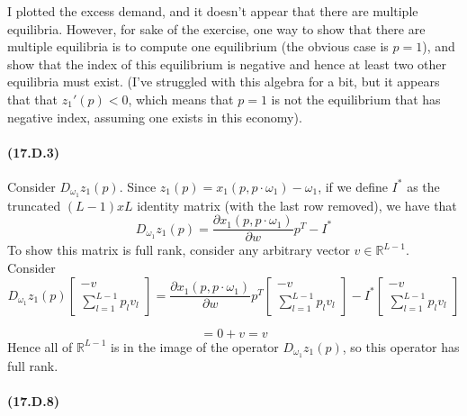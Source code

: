 \documentclass[10pt,letter]{article}
\begin{document}
I plotted the excess demand, and it doesn't appear that there are multiple equilibria. However, for sake of the exercise, one way to show that there are multiple equilibria is to compute one equilibrium (the obvious case is $p=1$), and show that the index of this equilibrium is negative and hence at least two other equilibria must exist. (I've struggled with this algebra for a bit, but it appears that that $z_1'(p) < 0$, which means that $p=1$ is not the equilibrium that has negative index, assuming one exists in this economy).

\paragraph{(17.D.3)}

Consider $D_{\omega_1}z_1(p)$. Since $z_1(p) = x_1(p, p\cdot\omega_1) - \omega_1$, if we define $I^*$ as the truncated $(L-1) x L$ identity matrix (with the last row removed), we have that
\[ D_{\omega_1} z_1(p) = \frac{\partial x_1(p, p\cdot\omega_1) }{\partial w} p^T - I^* \]
To show this matrix is full rank, consider any arbitrary vector $v \in \mathbb{R}^{L-1}$. Consider
\[ D_{\omega_1}z_1(p) \begin{bmatrix} -v \\ \sum_{l=1}^{L-1} p_l v_l \end{bmatrix} = \frac{\partial x_1(p, p\cdot\omega_1) }{\partial w} p^T \begin{bmatrix} -v \\ \sum_{l=1}^{L-1} p_l v_l \end{bmatrix} - I^* \begin{bmatrix} -v \\ \sum_{l=1}^{L-1} p_l v_l \end{bmatrix} \]

\[ = 0 + v = v \]
Hence all of $\mathbb{R}^{L-1}$ is in the image of the operator $D_{\omega_1}z_1(p)$, so this operator has full rank.

\paragraph{(17.D.8)}
\end{document}
